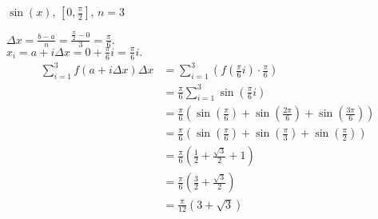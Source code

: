 \documentclass[nooutcomes]{ximera}
\renewenvironment{freeResponse}{
\ifhandout\setbox0\vbox\bgroup\else
\begin{trivlist}\item[\hskip \labelsep\bfseries Solution:\hspace{2ex}]
\fi}
{\ifhandout\egroup\else
\end{trivlist}
\fi}
\begin{document}
\begin{problem}
\begin{enumerate}
		
		
	\item  $\sin (x)$, \; $\left[ 0, \frac{\pi}{2} \right]$, \; $n=3$
		\begin{freeResponse}
		$\Delta x=\frac{b-a}{n}=\frac{\frac{\pi }{2}-0}{3}=\frac{\pi }{6}$.  \\
		$x_i=a+i\Delta x=0+\frac{\pi }{6}i=\frac{\pi }{6}i.$
		\begin{align*}
		\sum_{i=1}^{3}  f ( a + i \Delta x ) \Delta x  &= \sum_{i=1}^{3} \left( f \left( \frac{\pi}{6}i \right) \cdot \frac{\pi}{6} \right) \\
		&= \frac{\pi}{6} \sum_{i=1}^{3} \sin \left( \frac{\pi}{6} i \right) \\
		&= \frac{\pi}{6} \left( \sin \left( \frac{\pi}{6} \right) + \sin \left( \frac{2 \pi}{6} \right) + \sin \left( \frac{3 \pi}{6} \right) \right) \\
		&= \frac{\pi}{6} \left( \sin \left( \frac{\pi}{6} \right) + \sin \left( \frac{\pi}{3} \right) + \sin \left( \frac{\pi}{2} \right) \right) \\
		&= \frac{\pi}{6} \left( \frac{1}{2} + \frac{\sqrt{3}}{2} + 1 \right)  \\
		&= \frac{\pi}{6} \left( \frac{3}{2} + \frac{\sqrt{3}}{2} \right)  \\
		&= \frac{\pi}{12} (3 + \sqrt{3} )
		\end{align*}
		\end{freeResponse}
	\end{enumerate}
\end{problem}
	
\end{document}
